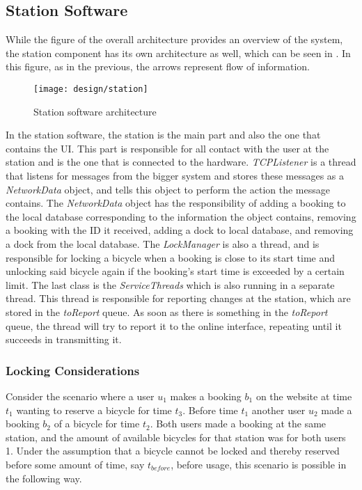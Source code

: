 \subsection{Station Software}
While the figure of the overall architecture provides an overview of the system, the station component has its own architecture as well, which can be seen in . In this figure, as in the previous, the arrows represent flow of information.

\begin{figure}[h]
	\centering
	\texttt{[image: design/station]}
	\caption{Station software architecture}\label{fig:stationarch}
\end{figure}

In the station software, the station is the main part and also the one that contains the UI. 
This part is responsible for all contact with the user at the station and is the one that is connected to the hardware.
\textit{TCPListener} is a thread that listens for messages from the bigger system and stores these messages as a \textit{NetworkData} object, and tells this object to perform the action the message contains.
The \textit{NetworkData} object has the responsibility of adding a booking to the local database corresponding to the information the object contains, removing a booking with the ID it received, adding a dock to local database, and removing a dock from the local database.
The \textit{LockManager} is also a thread, and is responsible for locking a bicycle when a booking is close to its start time and unlocking said bicycle again if the booking's start time is exceeded by a certain limit.
The last class is the \textit{ServiceThreads} which is also running in a separate thread.
This thread is responsible for reporting changes at the station, which are stored in the \textit{toReport} queue.
As soon as there is something in the \textit{toReport} queue, the thread will try to report it to the online interface, repeating until it succeeds in transmitting it.

\subsubsection{Locking Considerations}
Consider the scenario where a user $u_1$ makes a booking $b_1$ on the website at time $t_1$ wanting to reserve a bicycle for time $t_3$. Before time $t_1$ another user $u_2$ made a booking $b_2$ of a bicycle for time $t_2$. Both users made a booking at the same station, and the amount of available bicycles for that station was for both users 1. Under the assumption that a bicycle cannot be locked and thereby reserved before some amount of time, say $t_{before}$, before usage, this scenario is possible in the following way.

